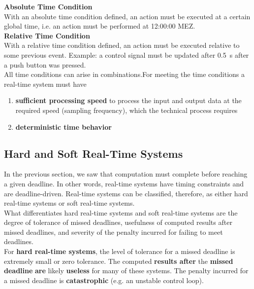 \textbf{Absolute Time Condition }\\
With an absolute time condition defined, an action must be executed at a certain global time, i.e. an action must be performed at 12:00:00 MEZ.\\

\textbf{Relative Time Condition }\\
With a relative time condition defined, an action must be executed relative to some previous event. Example: a control signal must be updated after 0.5~s after a push button was pressed.\\

All time conditions can arise in combinations.For meeting the time conditions a real-time system must have

\begin{enumerate}
	\item  \textbf{sufficient processing speed} to process the input and output data at the required speed (sampling frequency), which the technical process requires
	\item  \textbf{deterministic time behavior}
\end{enumerate}

\subsection{Hard and Soft Real-Time Systems}

In the previous section, we saw that computation must complete before reaching a given deadline. In other words, real-time systems have timing constraints and are deadline-driven. Real-time systems can be classified, therefore, as either hard real-time systems or soft real-time systems.\\

What differentiates hard real-time systems and soft real-time systems are the degree of tolerance of missed deadlines, usefulness of computed results after missed deadlines, and severity of the penalty incurred for failing to meet deadlines.\\

For \textbf{hard real-time systems}, the level of tolerance for a missed deadline is extremely small or zero tolerance. The computed \textbf{results after} the \textbf{missed} \textbf{deadline} \textbf{are} likely \textbf{useless} for many of these systems. The penalty incurred for a missed deadline is \textbf{catastrophic} (e.g. an unstable control loop). \\

